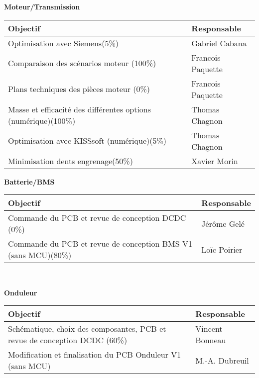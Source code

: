 \textbf{\large Moteur/Transmission}\\
\begin{tabularx}{\linewidth}{
    |>{\hsize=1.75\hsize}X|%
    >{\hsize=0.25\hsize}X|%
  }
    \hline
    \textbf{Objectif} & \textbf{Responsable} \\\hline
     Optimisation avec Siemens(5\%)  & Gabriel Cabana \\\hline
     Comparaison des scénarios moteur (100\%)  & Francois Paquette \\\hline
      Plans techniques des pièces moteur (0\%)  & Francois Paquette \\\hline
     Masse et efficacité des différentes options (numérique)(100\%)  &  Thomas Chagnon\\\hline
     Optimisation avec KISSsoft (numérique)(5\%)  &  Thomas Chagnon\\\hline
     Minimisation dents engrenage(50\%) & Xavier Morin\\\hline
\end{tabularx}
\medskip

\textbf{\large Batterie/BMS}
\\
\begin{tabularx}{\linewidth}{
    |>{\hsize=1.75\hsize}X|%
    >{\hsize=0.25\hsize}X|%
  }
    \hline
    \textbf{Objectif} & \textbf{Responsable} \\\hline
    Commande du PCB et revue de conception DCDC (0\%)  & Jérôme Gelé \\\hline 
    Commande du PCB et revue de conception BMS V1 (sans MCU)(80\%) & Loïc Poirier\\\hline
\end{tabularx}\\
\medskip

\textbf{\large Onduleur}\\
\begin{tabularx}{\linewidth}{
    |>{\hsize=1.75\hsize}X|%
    >{\hsize=0.25\hsize}X|%
  }
    \hline
    \textbf{Objectif} & \textbf{Responsable} \\\hline
    Schématique, choix des composantes, PCB et revue de conception DCDC (60\%)  & Vincent Bonneau \\\hline 
    Modification et finalisation du PCB Onduleur V1 (sans MCU) & M.-A. Dubreuil\\\hline
\end{tabularx}
\medskip

